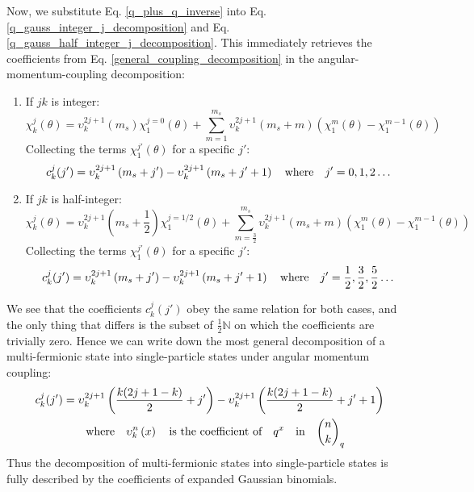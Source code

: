 \documentclass[12pt]{article}
\begin{document}
	Now, we substitute Eq. \ref{q_plus_q_inverse} into Eq. \ref{q_gauss_integer_j_decomposition} and Eq. \ref{q_gauss_half_integer_j_decomposition}. This immediately retrieves the coefficients from Eq. \ref{general_coupling_decomposition} in the angular-momentum-coupling decomposition:
	\begin{enumerate}
	\item If $jk$ is integer:
	\begin{equation}
	\chi^j_k(\theta) = \upsilon^{2j+1}_k\left(m_s\right)\chi^{j=0}_1(\theta) + \sum_{m=1}^{m_s} \upsilon^{2j+1}_k\left(m_s+m\right)\left(\chi^m_1(\theta)-\chi^{m-1}_1(\theta)\right)
	\end{equation}
	Collecting the terms $\chi^{j'}_1(\theta)$ for a specific $j'$:
	\begin{equation}
	c^j_k(j') = \upsilon^{2j+1}_k\left(m_s+j'\right)-\upsilon^{2j+1}_k\left(m_s+j'+1\right)\qq{where}j'=0,1,2\dots
	\end{equation}
	\item If $jk$ is half-integer:
	\begin{equation}
	\chi^j_k(\theta) = \upsilon^{2j+1}_k\left(m_s+\frac{1}{2}\right)\chi^{j=1/2}_1(\theta) + \sum_{m=\frac{3}{2}}^{m_s} \upsilon^{2j+1}_k\left(m_s+m\right)\left(\chi^m_1(\theta)-\chi^{m-1}_1(\theta)\right)
	\end{equation}
	Collecting the terms $\chi^{j'}_1(\theta)$ for a specific $j'$:
	\begin{equation}
	c^j_k(j') = \upsilon^{2j+1}_k\left(m_s+j'\right)-\upsilon^{2j+1}_k\left(m_s+j'+1\right)\qq{where}j'=\frac{1}{2},\frac{3}{2},\frac{5}{2}\dots
	\end{equation}
	\end{enumerate}
	We see that the coefficients $c^j_k(j')$ obey the same relation for both cases, and the only thing that differs is the subset of $\frac{1}{2}\mathbb{N}$ on which the coefficients are trivially zero. Hence we can write down the most general decomposition of a multi-fermionic state into single-particle states under angular momentum coupling:
	\begin{multline} \label{decomposition_via_gaussian_binomials}
	c^j_k(j') = \upsilon^{2j+1}_k\left(\frac{k(2j+1-k)}{2}+j'\right)-\upsilon^{2j+1}_k\left(\frac{k(2j+1-k)}{2}+j'+1\right)\\
	\qq{where} \upsilon^n_k\left(x\right)\qq{is the coefficient of} q^x \qq{in} {n\choose k}_q
	\end{multline}
	Thus the decomposition of multi-fermionic states into single-particle states is fully described by the coefficients of expanded Gaussian binomials.
	
\end{document}
